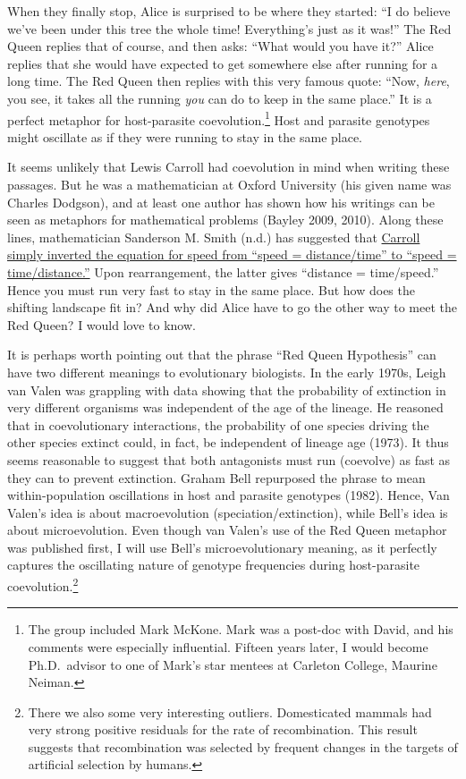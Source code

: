 \documentclass[
  letterpaper,
]{book}
\begin{document}
When they finally stop, Alice is surprised to be where they started: ``I
do believe we've been under this tree the whole time! Everything's just
as it was!'' The Red Queen replies that of course, and then asks: ``What
would you have it?'' Alice replies that she would have expected to get
somewhere else after running for a long time. The Red Queen then replies
with this very famous quote: ``Now, \emph{here}, you see, it takes all
the running \emph{you} can do to keep in the same place.'' It is a
perfect metaphor for host-parasite coevolution.\footnote{The group
  included Mark McKone. Mark was a post-doc with David, and his comments
  were especially influential. Fifteen years later, I would become
  Ph.D.~advisor to one of Mark's star mentees at Carleton College,
  Maurine Neiman.} Host and parasite genotypes might oscillate as if
they were running to stay in the same place.

It seems unlikely that Lewis Carroll had coevolution in mind when
writing these passages. But he was a mathematician at Oxford University
(his given name was Charles Dodgson), and at least one author has shown
how his writings can be seen as metaphors for mathematical problems
(Bayley 2009, 2010). Along these lines, mathematician Sanderson M. Smith
(n.d.) has suggested that
\href{http://www.herkimershideaway.org/writings/carroll.htm}{Carroll
simply inverted the equation for speed from ``speed = distance/time'' to
``speed = time/distance.''} Upon rearrangement, the latter gives
``distance = time/speed.'' Hence you must run very fast to stay in the
same place. But how does the shifting landscape fit in? And why did
Alice have to go the other way to meet the Red Queen? I would love to
know.

It is perhaps worth pointing out that the phrase ``Red Queen
Hypothesis'' can have two different meanings to evolutionary biologists.
In the early 1970s, Leigh van Valen was grappling with data showing that
the probability of extinction in very different organisms was
independent of the age of the lineage. He reasoned that in
coevolutionary interactions, the probability of one species driving the
other species extinct could, in fact, be independent of lineage age
(1973). It thus seems reasonable to suggest that both antagonists must
run (coevolve) as fast as they can to prevent extinction. Graham Bell
repurposed the phrase to mean within-population oscillations in host and
parasite genotypes (1982). Hence, Van Valen's idea is about
macroevolution (speciation/extinction), while Bell's idea is about
microevolution. Even though van Valen's use of the Red Queen metaphor
was published first, I will use Bell's microevolutionary meaning, as it
perfectly captures the oscillating nature of genotype frequencies during
host-parasite coevolution.\footnote{There we also some very interesting
  outliers. Domesticated mammals had very strong positive residuals for
  the rate of recombination. This result suggests that recombination was
  selected by frequent changes in the targets of artificial selection by
  humans.}
\end{document}
